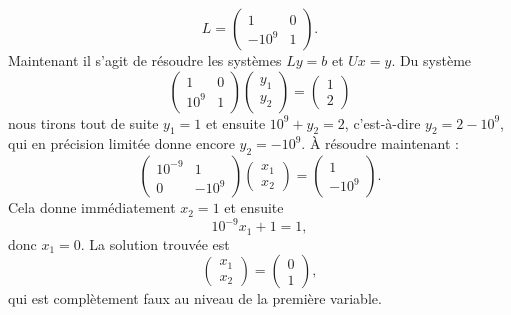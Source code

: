 \begin{example}
    \begin{equation}
        L=\begin{pmatrix}
            1    &   0    \\
            -10^9    &   1
        \end{pmatrix}.
    \end{equation}
    Maintenant il s'agit de résoudre les systèmes \( Ly=b\) et \( Ux=y\). Du système
    \begin{equation}
        \begin{pmatrix}
            1    &   0    \\
            10^9    &   1
        \end{pmatrix}\begin{pmatrix}
            y_1    \\
            y_2
        \end{pmatrix}=\begin{pmatrix}
            1    \\
            2
        \end{pmatrix}
    \end{equation}
    nous tirons tout de suite \( y_1=1\) et ensuite \( 10^9+y_2=2\), c'est-à-dire \( y_2=2-10^9\), qui en précision limitée donne encore \( y_2=-10^9\). À résoudre maintenant :
    \begin{equation}
        \begin{pmatrix}
            10^{-9}    &   1    \\
            0    &   -10^9
        \end{pmatrix}\begin{pmatrix}
            x_1    \\
            x_2
        \end{pmatrix}=\begin{pmatrix}
            1    \\
            -10^9
        \end{pmatrix}.
    \end{equation}
    Cela donne immédiatement \( x_2=1\) et ensuite
    \begin{equation}
        10^{-9}x_1+1=1,
    \end{equation}
    donc \( x_1=0\). La solution trouvée est
    \begin{equation}        \label{EQooBGWEooVGSVoe}
        \begin{pmatrix}
            x_1    \\
            x_2
        \end{pmatrix}=\begin{pmatrix}
            0    \\
            1
        \end{pmatrix},
    \end{equation}
    qui est complètement faux au niveau de la première variable.
\end{example}

